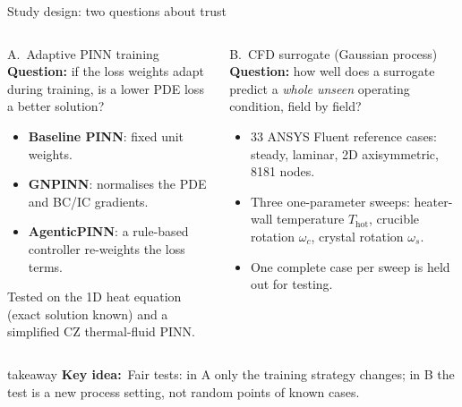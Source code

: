 \documentclass[aspectratio=169,10pt,t]{beamer}
\newcommand{\key}[1]{\textcolor{qblue}{\textbf{#1}}}
\newcommand{\takeaway}[1]{%
  \par\vfill
  \begin{beamercolorbox}[wd=\linewidth,sep=5pt,rounded=true]{takeaway}
    \small\textcolor{qblue}{\textbf{Key idea:}}~#1
  \end{beamercolorbox}\vspace{1mm}}
\begin{document}
\begin{frame}
\begin{frame}{Study design: two questions about trust}
\begin{columns}[T,onlytextwidth]
\begin{block}{A.\ Adaptive PINN training}
\small \textbf{Question:} if the loss weights adapt during training, is a lower PDE loss a better solution?
\begin{itemize}\small
  \item \key{Baseline PINN}: fixed unit weights.
  \item \key{GNPINN}: normalises the PDE and BC/IC gradients.
  \item \key{AgenticPINN}: a rule-based controller re-weights the loss terms.
\end{itemize}
\small Tested on the 1D heat equation (exact solution known) and a simplified CZ thermal-fluid PINN.
\end{block}
\begin{block}{B.\ CFD surrogate (Gaussian process)}
\small \textbf{Question:} how well does a surrogate predict a \emph{whole unseen} operating condition, field by field?
\begin{itemize}\small
  \item 33 ANSYS Fluent reference cases: steady, laminar, 2D axisymmetric, 8181 nodes.
  \item Three one-parameter sweeps: heater-wall temperature $T_{\mathrm{hot}}$, crucible rotation $\omega_c$, crystal rotation $\omega_s$.
  \item One complete case per sweep is held out for testing.
\end{itemize}
\end{block}
\end{columns}
\takeaway{Fair tests: in A only the training strategy changes; in B the test is a new process setting, not random points of known cases.}
\end{frame}


\end{frame}
\end{document}
